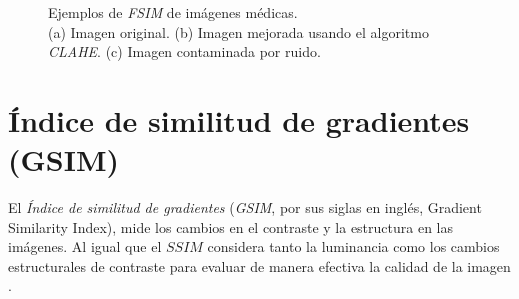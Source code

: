\begin{figure}[H]
    \begin{center}
    \end{center}
    \caption{Ejemplos de \textit{FSIM} de imágenes médicas. \\
    (a) Imagen original.
    (b) Imagen mejorada usando el algoritmo \textit{CLAHE}.
    (c) Imagen contaminada por ruido.}
    \label{fig:fsim}
\end{figure}


\section{Índice de similitud de gradientes (GSIM)} 
\label{sec:gsim}

El \textit{Índice de similitud de gradientes} (\textit{GSIM}, por sus siglas en inglés, Gradient Similarity Index), mide los cambios en el contraste y la estructura en las imágenes. Al igual que el $SSIM$ considera tanto la luminancia como los cambios estructurales de contraste para evaluar de manera efectiva la calidad de la imagen \cite{gsim2012}.

